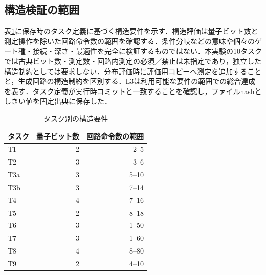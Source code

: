 \subsection{構造検証の範囲}
表\ref{tab:structure}に保存時のタスク定義に基づく構造要件を示す．構造評価は量子ビット数と測定操作を除いた回路命令数の範囲を確認する．条件分岐などの意味や個々のゲート種・接続・深さ・最適性を完全に検証するものではない．本実験の10タスクでは古典ビット数・測定数・回路内測定の必須／禁止は未指定であり，独立した構造制約としては要求しない．分布評価時に評価用コピーへ測定を追加することと，生成回路の構造制約を区別する．L3は利用可能な要件の範囲での総合達成を表す．タスク定義が実行時コミットと一致することを確認し，ファイルhashとしきい値を固定出典に保存した．
\begin{table}[t]
\centering
\caption{タスク別の構造要件}
\label{tab:structure}
\begin{tabular}{l|rr}
\hline
タスク & 量子ビット数 & 回路命令数の範囲 \\
\hline
T1 & 2 & 2--5 \\
T2 & 3 & 3--6 \\
T3a & 3 & 5--10 \\
T3b & 3 & 7--14 \\
T4 & 4 & 7--16 \\
T5 & 2 & 8--18 \\
T6 & 3 & 1--50 \\
T7 & 3 & 1--60 \\
T8 & 4 & 8--80 \\
T9 & 2 & 4--10 \\
\hline
\end{tabular}
\end{table}
